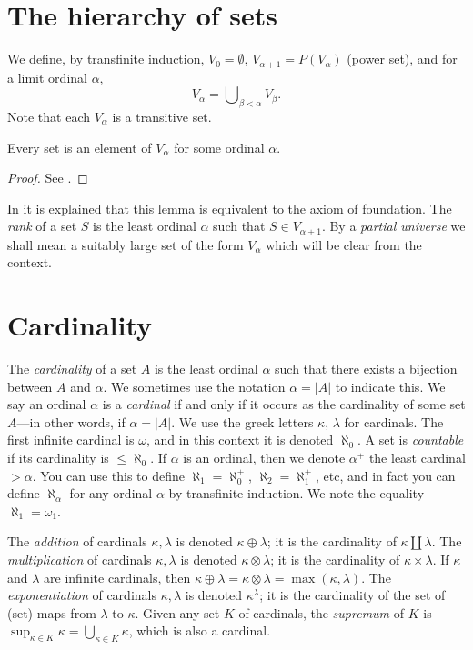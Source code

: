 \section{The hierarchy of sets}
\label{section-sets-hierarchy}

\noindent
We define, by transfinite induction, $V_0 = \emptyset$,
$V_{\alpha + 1} = P(V_\alpha)$ (power set),
and for a limit ordinal $\alpha$,
$$
V_\alpha = \bigcup\nolimits_{\beta < \alpha} V_\beta.
$$
Note that each $V_\alpha$ is a transitive set.

\begin{lemma}
\label{lemma-axiom-regularity}
Every set is an element of $V_\alpha$ for some ordinal $\alpha$.
\end{lemma}

\begin{proof}
See \cite[Lemma 6.3]{Jech}.
\end{proof}

\noindent
In \cite[Chapter III]{Kunen} it is explained that this lemma is
equivalent to the axiom of foundation. The {\it rank} of
a set $S$ is the least ordinal $\alpha$ such that $S \in V_{\alpha + 1}$.
By a {\it partial universe} we shall mean a suitably large set of the form
$V_\alpha$ which will be clear from the context.

\section{Cardinality}
\label{section-cardinals}

\noindent
The {\it cardinality} of a set $A$ is the least ordinal $\alpha$
such that there exists a bijection between $A$ and $\alpha$.
We sometimes use the notation $\alpha = |A|$ to indicate this.
We say an ordinal $\alpha$ is a {\it cardinal} if and only
if it occurs as the cardinality of some set $A$---in other words, if
$\alpha = |A|$. We use the greek letters $\kappa$, $\lambda$
for cardinals. The first infinite cardinal is $\omega$, and in this
context it is denoted $\aleph_0$. A set is {\it countable} if its cardinality
is $\leq \aleph_0$. If $\alpha$ is an ordinal, then we denote
$\alpha^+$ the least cardinal $> \alpha$. You can use this to
define $\aleph_1 = \aleph_0^+$, $\aleph_2 = \aleph_1^+$, etc, and
in fact you can define $\aleph_\alpha$ for any ordinal $\alpha$ by
transfinite induction. We note the equality $\aleph_1 = \omega_1$.

\medskip\noindent
The {\it addition} of cardinals $\kappa, \lambda$
is denoted $\kappa \oplus \lambda$; it is the cardinality of
$\kappa \amalg \lambda$. The {\it multiplication} of cardinals
$\kappa, \lambda$ is denoted $\kappa \otimes \lambda$; it is the
cardinality of $\kappa \times \lambda$. If
$\kappa$ and $\lambda$ are infinite cardinals, then
$\kappa \oplus \lambda = \kappa \otimes \lambda = \max(\kappa, \lambda)$.
The {\it exponentiation}
of cardinals $\kappa, \lambda$ is denoted $\kappa^\lambda$; it is
the cardinality of the set of (set) maps from $\lambda$ to $\kappa$.
Given any set $K$ of cardinals, the {\it supremum} of $K$
is $\sup_{\kappa \in K} \kappa = \bigcup_{\kappa \in K} \kappa$,
which is also a cardinal.

